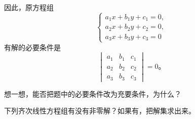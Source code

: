 因此，原方程组
$$\begin{cases}
    a_1x + b_1y + c_1 = 0, \\
    a_2x + b_2y + c_2 = 0, \\
    a_3x + b_3y + c_3 = 0
\end{cases}$$
有解的必要条件是
$$\begin{vmatrix*}
	a_1 & b_1 & c_1 \\
	a_2 & b_2 & c_2 \\
	a_3 & b_3 & c_3
\end{vmatrix*} = 0 \text{。}$$

想一想，能否把题中的必要条件改为充要条件，为什么？

\lianxi

下列齐次线性方程组有没有非零解？如果有，把解集求出来。

\begin{xiaoxiaotis}
\end{xiaoxiaotis}

